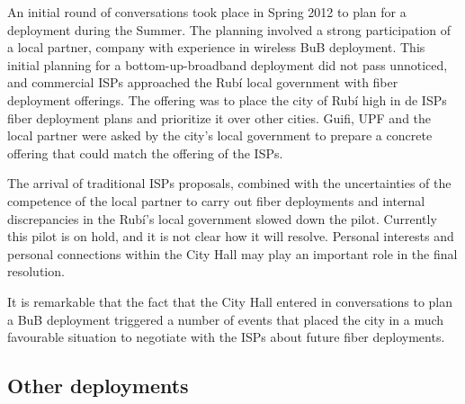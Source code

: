 An initial round of conversations took place in Spring 2012 to plan for a deployment during the Summer.
The planning involved a strong participation of a local partner, company with experience in wireless BuB deployment.
This initial planning for a bottom-up-broadband deployment did not pass unnoticed, and commercial ISPs approached the Rub\'{i} local government with fiber deployment offerings.
The offering was to place the city of Rub\'{i} high in de ISPs fiber deployment plans and prioritize it over other cities.
Guifi, UPF and the local partner were asked by the city's local government to prepare a concrete offering that could match the offering of the ISPs.

The arrival of traditional ISPs proposals, combined with the uncertainties of the competence of the local partner to carry out fiber deployments and internal discrepancies in the Rub\'{i}'s local government slowed down the pilot.
Currently this pilot is on hold, and it is not clear how it will resolve.
Personal interests and personal connections within the City Hall may play an important role in the final resolution.

It is remarkable that the fact that the City Hall entered in conversations to plan a BuB deployment triggered a number of events that placed the city in a much favourable situation to negotiate with the ISPs about future fiber deployments.

\subsection{Other deployments}

